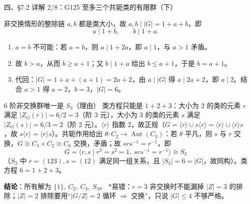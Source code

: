 \documentclass[aspectratio=169,10pt,fontset=none]{ctexbeamer}
\newcommand{\key}[1]{\textcolor{ink}{\bfseries #1}}
\newcommand{\starpt}{\textcolor{accent}{\bfseries$\ast$}}
\begin{document}
\begin{frame}[t]{四、\S7.2 详解 2/8：G125 至多三个共轭类的有限群（下）}
\scriptsize
\begin{block}{\footnotesize 非交换情形的整除链}
$a,b$ 都是类大小，故 $a,b\mid|G|=1+a+b$，即
\[
a\mid 1+b,\qquad b\mid 1+a.
\]
\begin{enumerate}\setlength{\itemsep}{1pt}
\item $a=b$ 不可能：若 $a=b$，则 $a\mid 1+2a$，即 $a\mid1$，与 $a>1$ 矛盾。
\item 故 $b>a$，从而 $b\ge a+1$；又 $b\mid1+a$ 给出 $b\le a+1$，于是 $b=a+1$。
\item 代回：$|G|=1+a+(a+1)=2a+2$，由 $a\mid|G|$ 得 $a\mid2a+2$，即 $a\mid2$。结合 $a>1$ 得 $a=2$，$b=3$，$|G|=6$。
\end{enumerate}
\end{block}
\begin{block}{\footnotesize 6 阶非交换群唯一是 $S_3$（理由）}
类方程只能是 $1+2+3$：大小为 2 的类的元素 $r$ 满足 $|Z_G(r)|=6/2=3$（阶 3 元），大小为 3 的类的元素 $s$ 满足 $|Z_G(s)|=6/3=2$（阶 2 元）。$\langle r\rangle$ 指数 2，故正规（$G=\langle r\rangle\cup s\langle r\rangle=\langle r\rangle\cup\langle r\rangle s$，故 $s\langle r\rangle=\langle r\rangle s$）。共轭作用给出 $\theta:C_2\to\operatorname{Aut}(C_3)$：若 $\theta$ 平凡，则 $s$ 与 $r$ 交换，$G\cong C_3\times C_2\cong C_6$ 交换，矛盾；故 $srs^{-1}=r^{-1}$，即
\[
G=\langle r,s\mid r^3=s^2=1,\ srs^{-1}=r^{-1}\rangle\cong S_3
\]
（$S_3$ 中 $r=(123),s=(12)$ 满足同一组关系，且 $|S_3|=6=|G|$，故同构）。类方程 $6=1+2+3$。
\end{block}
\key{结论}：所有解为 $\{1\},\ C_2,\ C_3,\ S_3$。\quad
\starpt 易错：$r=3$ 非交换时不能漏掉 $|Z|=3$ 的排除；$|Z|=2$ 排除要用“$|G/Z|=2$ 循环 $\Rightarrow$ 交换”，只说 $|G|\le4$ 不够严格。
\end{frame}
\end{document}
